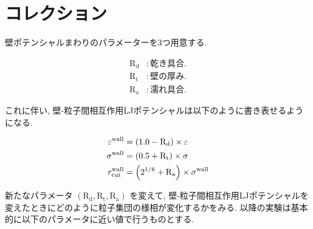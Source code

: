 \documentclass[dvipdfmx]{jsarticle}
\numberwithin{equation}{subsection}
\begin{document}



\section{コレクション}

壁ポテンシャルまわりのパラメーターを3つ用意する.

\begin{align}
  \text{R}_\text{d} &: 乾き具合. \\
  \text{R}_\text{t} &: 壁の厚み. \\
  \text{R}_\text{a} &: 濡れ具合.
\end{align}

これに伴い, 壁-粒子間相互作用LJポテンシャルは以下のように書き表せるようになる.

\begin{align}
  \varepsilon^{\text{wall}} &= \qty(1.0 - \text{R}_\text{d}) \times \varepsilon \\
  \sigma^{\text{wall}} &= \qty(0.5 + \text{R}_\text{t}) \times \sigma \\
  r^{\text{wall}}_{\text{cut}} &= \qty(2^{1/6} + \text{R}_\text{a}) \times \sigma^{\text{wall}}
\end{align}

新たなパラメータ $(\text{R}_\text{d}, \text{R}_\text{t}, \text{R}_\text{a})$ を変えて, 壁-粒子間相互作用LJポテンシャルを変えたときにどのように粒子集団の様相が変化するかをみる. 以降の実験は基本的に以下のパラメータに近い値で行うものとする. 
\end{document}

